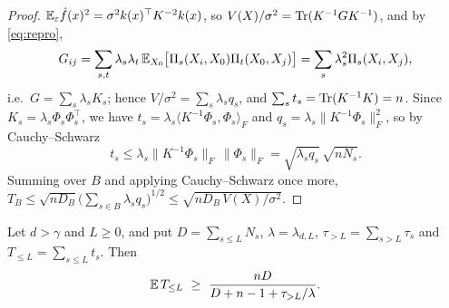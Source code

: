 \begin{proof}
$\mathbb{E}_\varepsilon\hat f(x)^2=\sigma^2k(x)^\top K^{-2}k(x)$, so $V(X)/\sigma^2=\operatorname{Tr}(K^{-1}GK^{-1})$, and by
\eqref{eq:repro},
\[
G_{ij}=\sum_{s,t}\lambda_s\lambda_t\,\mathbb{E}_{X_0}\big[\Pi_s(X_i,X_0)\Pi_t(X_0,X_j)\big]=\sum_s\lambda_s^2\Pi_s(X_i,X_j),
\]
i.e.\ $G=\sum_s\lambda_sK_s$; hence $V/\sigma^2=\sum_s\lambda_sq_s$, and
$\sum_st_s=\operatorname{Tr}(K^{-1}K)=n$. Since $K_s=\lambda_s\Phi_s\Phi_s^\top$, we have
$t_s=\lambda_s\langle K^{-1}\Phi_s,\Phi_s\rangle_F$ and $q_s=\lambda_s\|K^{-1}\Phi_s\|_F^2$, so by
Cauchy--Schwarz
\[
t_s\le\lambda_s\|K^{-1}\Phi_s\|_F\,\|\Phi_s\|_F=\sqrt{\lambda_sq_s}\,\sqrt{nN_s}.
\]
Summing over $B$ and applying Cauchy--Schwarz once more,
$T_B\le\sqrt{nD_B}\big(\sum_{s\in B}\lambda_sq_s\big)^{1/2}\le\sqrt{nD_B\,V(X)/\sigma^2}$.
\end{proof}

\begin{lemma}\label{lem:leverage}
Let $d>\gamma$ and $L\ge0$, and put $D=\sum_{s\le L}N_s$, $\lambda=\lambda_{d,L}$, $\tau_{>L}=\sum_{s>L}\tau_s$
and $T_{\le L}=\sum_{s\le L}t_s$. Then
\begin{equation}
\E\,T_{\le L}\ \ge\ \frac{nD}{D+n-1+\tau_{>L}/\lambda}.
\label{eq:leverage}
\end{equation}
\end{lemma}


